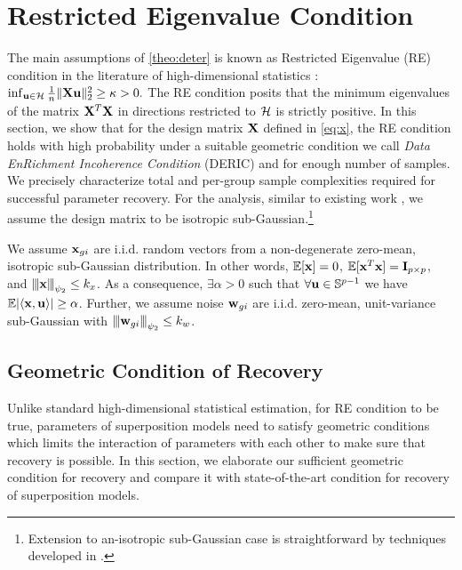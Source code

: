 \section{Restricted Eigenvalue Condition}
\label{sec:re}
The main assumptions of \cref{theo:deter} is known as Restricted Eigenvalue (RE) condition in the literature of high-dimensional statistics \cite{banerjee14, nrwy12, raskutti10}:
$\inf_{\u \in \cH} \frac{1}{n} \norm{\X \u}{2}^2 \geq \kappa > 0.$
The RE condition posits that the minimum eigenvalues of the matrix $\mathbf{X}^T \mathbf{X}$ in directions restricted to $\cH$ is strictly positive.
In this section, we show that for the design matrix $\mathbf{X}$ defined in \cref{eq:x}, the RE condition holds with high probability under a suitable geometric condition we call {\em Data EnRichment Incoherence Condition} (DERIC) and for enough number of samples.
We precisely characterize total and per-group sample complexities required for successful parameter recovery.
For the analysis, similar to existing work \cite{guba16, mend15, trop15}, we assume the design matrix to be isotropic sub-Gaussian.\footnote{Extension to an-isotropic sub-Gaussian case is straightforward by techniques developed in \cite{banerjee14, ruzh13}.}
\begin{definition}
	\label{def:obs}
	We assume $\mathbf{x}_{gi}$ are i.i.d. random vectors from a non-degenerate zero-mean, isotropic sub-Gaussian distribution. In other words, $\mathbb{E} [\mathbf{x}] = 0$, $\mathbb{E} [\mathbf{x}^T \mathbf{x}] = \mathbf{I}_{p \times p}$, and ${\left\vert\kern-0.25ex\left\vert\kern-0.25ex\left\vert \mathbf{x} \right\vert\kern-0.25ex\right\vert\kern-0.25ex\right\vert}_{\psi_2} \leq k_x$.	
As a consequence, $\exists \alpha > 0$ such that $\forall \mathbf{u} \in \mathbb S^{p-1}$ we have $ \mathbb{E}|\langle \mathbf{x}, \mathbf{u} \rangle| \geq \alpha$. Further, we assume noise $\mathbf{w}_{gi} $ are i.i.d.
zero-mean, unit-variance sub-Gaussian with ${\left\vert\kern-0.25ex\left\vert\kern-0.25ex\left\vert \mathbf{w}_{gi} \right\vert\kern-0.25ex\right\vert\kern-0.25ex\right\vert}_{\psi_2} \leq k_w$.
\end{definition}

\subsection{Geometric Condition of Recovery}
Unlike standard high-dimensional statistical estimation, for RE condition to be true, parameters of superposition models need to satisfy geometric conditions which limits the interaction of parameters with each other to make sure that recovery is possible. In this section, we elaborate our sufficient geometric condition for recovery and compare it with state-of-the-art condition for recovery of superposition models. 

